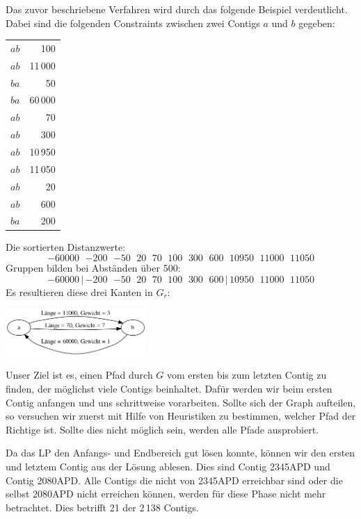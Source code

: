 Das zuvor beschriebene Verfahren wird durch das folgende Beispiel verdeutlicht. Dabei sind die folgenden Constraints zwischen zwei Contigs $a$ und $b$ gegeben:
\begin{center}
\begin{tabular}{lr}
$a$\quad $b$\quad &100\\
$a$\quad $b$\quad &11\,000\\
$b$\quad $a$\quad &50\\
$b$\quad $a$\quad &60\,000\\
$a$\quad $b$\quad &70\\
$a$\quad $b$\quad &300\\
$a$\quad $b$\quad &10\,950\\
$a$\quad $b$\quad &11\,050\\
$a$\quad $b$\quad &20\\
$a$\quad $b$\quad &600\\
$b$\quad $a$\quad &200
\end{tabular}
\end{center}
Die sortierten Distanzwerte:
\[-60000\ \ \,{-200}\ \ \,{-50}\ \ \,20\ \ \,70\ \ \,100\ \ \,300\ \ \,600\ \ \,10950\ \ \,11000\ \ \,11050\]
Gruppen bilden bei Abständen über 500:
\[-60000\,|\, {-200}\ \ \,{-50}\ \ \,20\ \ \,70\ \ \,100\ \ \,300\ \ \,600\, |\, 10950\ \ \,11000\ \ \,11050\]
Es resultieren diese drei Kanten in $G_r$:

\begin{center}
\includegraphics[width=0.4\textwidth]{bilder/dreikannten}
\end{center}


Unser Ziel ist es, einen Pfad durch $G$ vom ersten bis zum letzten Contig zu finden, der möglichst viele Contigs beinhaltet.
Dafür werden wir beim ersten Contig anfangen und uns schrittweise vorarbeiten. Sollte sich der Graph aufteilen, so versuchen wir zuerst mit Hilfe von Heuristiken zu bestimmen, welcher Pfad der Richtige ist. Sollte dies nicht möglich sein, werden alle Pfade ausprobiert.

Da das LP den Anfangs- und Endbereich gut lösen konnte, können wir den ersten und letztem Contig aus der Lösung ablesen. Dies sind Contig 2345APD und Contig 2080APD. Alle Contigs die nicht von 2345APD erreichbar sind oder die selbst 2080APD nicht erreichen können, werden für diese Phase nicht mehr betrachtet. Dies betrifft 21 der 2\,138 Contigs.

